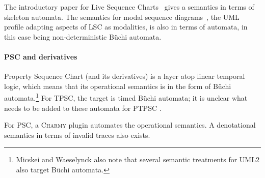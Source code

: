 The introductory paper for Live Sequence Charts~\cite{lsc} gives a
semantics in terms of skeleton automata.
The semantics for modal sequence diagrams~\cite{Harel08-ModalSD}, the
UML profile adapting aspects of LSC as modalities, is also in terms of
automata, in this case being
non-deterministic B\"uchi automata.

\paragraph{PSC and derivatives}

Property Sequence Chart (and its derivatives) is a layer atop
linear temporal logic, which means that its operational semantics is
in the form of B\"uchi automata.\footnote{
Micskei and Waeselynck also note that several semantic treatments for UML2 also
target B\"uchi automata.}
For TPSC, the target is timed B\"uchi
automata; it is unclear what needs to be added to these automata for PTPSC .


For PSC, a \textsc{Charmy} plugin automates the operational semantics.  A denotational semantics in terms of
invalid traces also exists.

